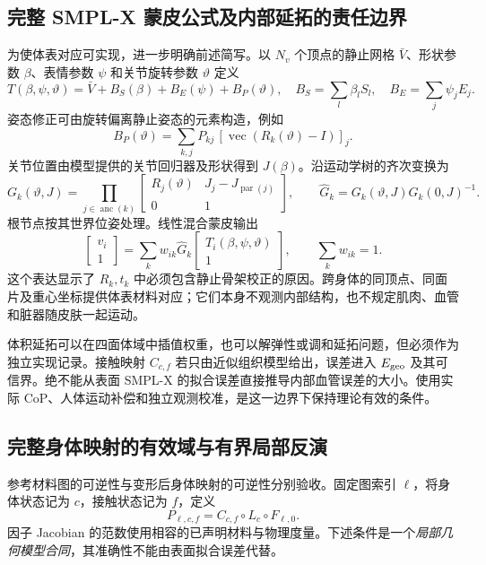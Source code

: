 \documentclass[11pt,a4paper]{article}
\numberwithin{equation}{section}
\theoremstyle{definition}
\begin{document}
\subsection{完整 SMPL-X 蒙皮公式及内部延拓的责任边界}
\label{sec:v43:smpl-detail}
为使体表对应可实现，进一步明确前述简写。以 $N_v$ 个顶点的静止网格 $\bar V$、形状参数 $\beta$、表情参数 $\psi$ 和关节旋转参数 $\vartheta$ 定义
\begin{equation}
 T(\beta,\psi,\vartheta)=\bar V+B_S(\beta)+B_E(\psi)+B_P(\vartheta),
 \quad B_S=\sum_l\beta_l S_l,\quad B_E=\sum_j\psi_j E_j.
\end{equation}
姿态修正可由旋转偏离静止姿态的元素构造，例如
\begin{equation}
 B_P(\vartheta)=\sum_{k,j}P_{kj}\,[\operatorname{vec}(R_k(\vartheta)-I)]_j.
\end{equation}
关节位置由模型提供的关节回归器及形状得到 $J(\beta)$。沿运动学树的齐次变换为
\begin{equation}
 G_k(\vartheta,J)=\prod_{j\in\operatorname{anc}(k)}
 \begin{bmatrix}R_j(\vartheta)&J_j-J_{\operatorname{par}(j)}\\0&1\end{bmatrix},
 \qquad \widehat G_k=G_k(\vartheta,J)G_k(0,J)^{-1}.
\end{equation}
根节点按其世界位姿处理。线性混合蒙皮输出
\begin{equation}
 \begin{bmatrix}v_i\\1\end{bmatrix}
 =\sum_k w_{ik}\widehat G_k
 \begin{bmatrix}T_i(\beta,\psi,\vartheta)\\1\end{bmatrix},
 \qquad \sum_k w_{ik}=1.
\end{equation}
这个表达显示了 $R_k,t_k$ 中必须包含静止骨架校正的原因。跨身体的同顶点、同面片及重心坐标提供体表材料对应；它们本身不观测内部结构，也不规定肌肉、血管和脏器随皮肤一起运动。

体积延拓可以在四面体域中插值权重，也可以解弹性或调和延拓问题，但必须作为独立实现记录。接触映射 $C_{c,f}$ 若只由近似组织模型给出，误差进入 $E_{\rm geo}$ 及其可信界。绝不能从表面 SMPL-X 的拟合误差直接推导内部血管误差的大小。使用实际 CoP、人体运动补偿和独立观测校准，是这一边界下保持理论有效的条件。

\subsection{完整身体映射的有效域与有界局部反演}
\label{sec:rev:full-map}
参考材料图的可逆性与变形后身体映射的可逆性分别验收。固定图索引 $\ell$，将身体状态记为 $c$，接触状态记为 $f$，定义
\begin{equation}
 P_{\ell,c,f}=C_{c,f}\circ L_c\circ F_{\ell,0}.
 \label{eq:rev:full-map}
\end{equation}
因子 Jacobian 的范数使用相容的已声明材料与物理度量。下述条件是一个\emph{局部几何模型合同}，其准确性不能由表面拟合误差代替。
\end{document}
